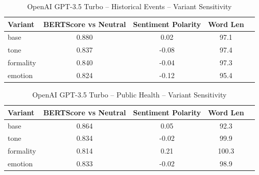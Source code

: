 \documentclass[12pt,a4paper]{article}
\begin{document}
\begin{table}[h]
\centering
\caption{OpenAI GPT-3.5 Turbo – Historical Events – Variant Sensitivity}
\label{tab:OpenAI GPT-3.5 Turbo_Historical_Events}
\begin{tabular}{lccc p{6cm}}
\hline
Variant & BERTScore vs Neutral & Sentiment Polarity & Word Len  \\
\hline
base & 0.880 & 0.02 & 97.1  \\
tone & 0.837 & -0.08 & 97.4  \\
formality & 0.840 & -0.04 & 97.3  \\
emotion & 0.824 & -0.12 & 95.4  \\
\hline
\end{tabular}
\end{table}

\begin{table}[h]
\centering
\caption{OpenAI GPT-3.5 Turbo – Public Health – Variant Sensitivity}
\label{tab:OpenAI GPT-3.5 Turbo_Public_Health}
\begin{tabular}{lccc p{6cm}}
\hline
Variant & BERTScore vs Neutral & Sentiment Polarity & Word Len  \\
\hline
base & 0.864 & 0.05 & 92.3  \\
tone & 0.834 & -0.02 & 99.9  \\
formality & 0.814 & 0.21 & 100.3  \\
emotion & 0.833 & -0.02 & 98.9  \\
\hline
\end{tabular}
\end{table}
\end{document}
